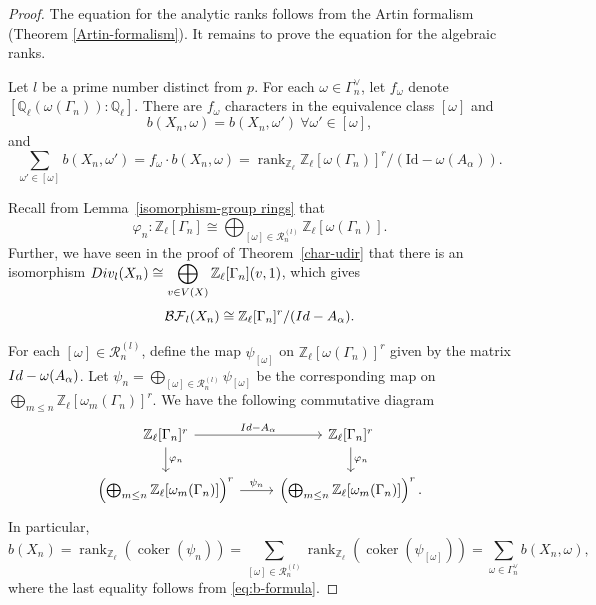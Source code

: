 \documentclass[10pt,a4paper]{amsart}
\newcommand{\BF}{\mathcal{BF}}
\newcommand{\Div}{\textup{Div}}
\newcommand{\QQ}{\mathbb{Q}}
\newcommand{\Ql}{\QQ_\ell}
\newcommand{\ZZ}{\mathbb{Z}}
\newcommand{\Zl}{\ZZ_\ell}
\DeclareMathOperator{\coker}{coker}
\DeclareMathOperator{\rank}{rank}
\newcommand{\sR}{\mathscr{R}}
\begin{document}
\begin{proof}
    The equation for the analytic ranks follows from the Artin formalism (Theorem \ref{Artin-formalism}). It remains to prove the equation for the algebraic ranks. 

   Let $l$ be a prime number distinct from $p$. For each $\omega\in\Gamma_n^\vee$, let $f_\omega$ denote $[\Ql(\omega(\Gamma_n)):\Ql]$. There are $f_\omega$ characters in the equivalence class $[\omega]$ and
   \[
   b(X_n,\omega)=b(X_n,\omega')\ \forall \omega'\in[\omega],
   \]
   and  
   \begin{equation}
   \label{eq:b-formula}\sum_{\omega'\in[\omega]}b(X_n,\omega')=f_\omega\cdot  b(X_n,\omega)=\rank_{\Zl}\Zl[\omega(\Gamma_n)]^r/(\mathrm{Id}-\omega(A_\alpha)).
   \end{equation}


 Recall from Lemma~\ref{isomorphism-group rings} that
    \[ \varphi_n:\Zl[\Gamma_n]\cong\bigoplus_{[\omega]\in\sR_n^{(l)}}\Zl[\omega(\Gamma_n)].\]
Further, we have seen in the proof of Theorem~\ref{char-udir} that there is an isomorphism $\Div_l(X_n)\cong\displaystyle \bigoplus_{v\in V(X)}\Zl[\Gamma_n](v,1)$, which gives
    \[\BF_l(X_n)\cong \Zl[\Gamma_n]^r/(\textup{Id}-A_\alpha).\] 
    
    For each $[\omega]\in\sR_n^{(l)}$,  define the map $\psi_{[\omega]}$ on $\Zl[\omega(\Gamma_n)]^r$ given by the matrix $\textup{Id}-\omega(A_\alpha)$. Let $\psi_n=\displaystyle\bigoplus_{[\omega]\in\sR_n^{(l)}}\psi_{[\omega]}$ be the corresponding map on $\displaystyle\bigoplus_{m\le n}\Zl[\omega_m(\Gamma_n)]^r$. We have the following commutative diagram
    \[\begin{tikzcd}
        \Zl[\Gamma_n]^r\arrow[r,"\textup{Id}-A_\alpha"]\arrow[d,"\varphi_n"]&\Zl[\Gamma_n]^r\arrow[d,"\varphi_n"]\\
        \left(\bigoplus_{m\le n}\Zl[\omega_m(\Gamma_n)]\right)^r\arrow[r, "\psi_n"]&\left(\bigoplus_{m\le n}\Zl[\omega_m(\Gamma_n)]\right)^r.
    \end{tikzcd}\]
    In particular, \[b(X_n)=\rank_{\Zl}(\coker(\psi_n))=\sum_{[\omega]\in \sR_n^{(l)}}\rank_{\Zl}(\coker(\psi_{[\omega]}))=\sum_{\omega\in \Gamma_n^\vee}b(X_n,\omega),\]
    where the last equality follows from \eqref{eq:b-formula}.
\end{proof}
\end{document}
